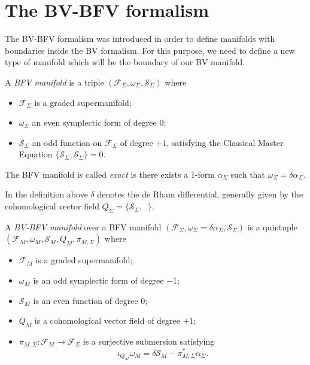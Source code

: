 \section{The BV-BFV formalism}
\label{sec:BF-BFV}

The BV-BFV formalism was introduced in order to define manifolds with boundaries inside the BV formalism.
For this purpose, we need to define a new type of manifold which will be the boundary of our BV manifold.

\begin{definition}
\label{def:BFV_manifold}
    A \emph{BFV manifold} is a triple $(\mathcal{F}_\Sigma, \omega_\Sigma, \mathcal{S}_\Sigma)$ where
    \begin{itemize}
        \item $\mathcal{F}_\Sigma$ is a graded supermanifold;
        \item $\omega_\Sigma$ an even symplectic form of degree $0$;
        \item $\mathcal{S}_\Sigma$ an odd function on $\mathcal{F}_\Sigma$ of degree $+1$, satisfying the Classical Master Equation $\{\mathcal{S}_\Sigma, \mathcal{S}_\Sigma\} = 0$.
    \end{itemize}
    The BFV manifold is called \emph{exact} is there exists a $1$-form $\alpha_\Sigma$ such that $\omega_\Sigma = \delta \alpha_\Sigma$.
\end{definition}

In the definition above $\delta$ denotes the de Rham differential, generally given by the cohomological vector field $Q_\Sigma = \{\mathcal{S}_\Sigma, \;\;\}$.

\begin{definition}
\label{def:BV-BFV}
    A \emph{BV-BFV manifold} over a BFV manifold $(\mathcal{F}_\Sigma, \omega_\Sigma = \delta \alpha_\Sigma, \mathcal{S}_\Sigma)$ is a quintuple $(\mathcal{F}_M, \omega_M, \mathcal{S}_M, Q_M, \pi_{M, \Sigma})$ where
    \begin{itemize}
        \item $\mathcal{F}_M$ is a graded supermanifold;
        \item $\omega_M$ is an odd symplectic form of degree $-1$;
        \item $\mathcal{S}_M$ is an even function of degree $0$;
        \item $Q_M$ is a cohomological vector field of degree $+1$;
        \item $\pi_{M, \Sigma}: \mathcal{F}_M \rightarrow \mathcal{F}_\Sigma$ is a surjective submersion satisfying
        \begin{equation}
            \iota_{Q_M} \omega_M = \delta \mathcal{S}_M - \pi^*_{M,\Sigma} \alpha_\Sigma.
        \end{equation}
    \end{itemize}
\end{definition}

